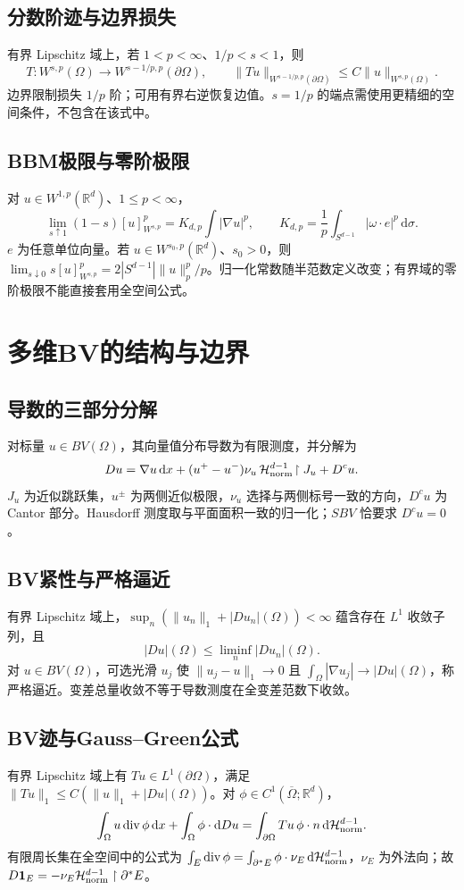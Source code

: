 \documentclass[../main.tex]{subfiles}
\begin{document}
\subsection{分数阶迹与边界损失}
有界 Lipschitz 域上，若 $1<p<\infty$、$1/p<s<1$，则
\[
T:W^{s,p}(\Omega)\to W^{s-1/p,p}(\partial\Omega),\qquad
\|Tu\|_{W^{s-1/p,p}(\partial\Omega)}\le C\|u\|_{W^{s,p}(\Omega)}.
\]
边界限制损失 $1/p$ 阶；可用有界右逆恢复边值。$s=1/p$ 的端点需使用更精细的空间条件，不包含在该式中。
\subsection{BBM极限与零阶极限}
对 $u\in W^{1,p}(\mathbb R^d)$、$1\le p<\infty$，
\[
\lim_{s\uparrow1}(1-s)[u]_{W^{s,p}}^p
=K_{d,p}\int|\nabla u|^p,\qquad K_{d,p}=\frac1p\int_{S^{d-1}}|\omega\cdot e|^p\,\mathrm d\sigma.
\]
$e$ 为任意单位向量。若 $u\in W^{s_0,p}(\mathbb R^d)$、$s_0>0$，则 $\lim_{s\downarrow0}s[u]_{W^{s,p}}^p=2|S^{d-1}|\|u\|_p^p/p$。归一化常数随半范数定义改变；有界域的零阶极限不能直接套用全空间公式。
\section{多维BV的结构与边界}\label{sec:ra-bv}
\subsection{导数的三部分分解}
对标量 $u\in BV(\Omega)$，其向量值分布导数为有限测度，并分解为
\[
Du=\nabla u\,\mathrm dx+(u^+-u^-)\nu_u\,
\mathcal H^{d-1}_{\rm norm}\!\restriction J_u+D^cu.
\]
$J_u$ 为近似跳跃集，$u^\pm$ 为两侧近似极限，$\nu_u$ 选择与两侧标号一致的方向，$D^cu$ 为 Cantor 部分。Hausdorff 测度取与平面面积一致的归一化；$SBV$ 恰要求 $D^cu=0$。
\subsection{BV紧性与严格逼近}
有界 Lipschitz 域上，$\sup_n(\|u_n\|_1+|Du_n|(\Omega))<\infty$ 蕴含存在 $L^1$ 收敛子列，且
\[
|Du|(\Omega)\le\liminf_n|Du_n|(\Omega).
\]
对 $u\in BV(\Omega)$，可选光滑 $u_j$ 使 $\|u_j-u\|_1\to0$ 且 $\int_\Omega|\nabla u_j|\to|Du|(\Omega)$，称严格逼近。变差总量收敛不等于导数测度在全变差范数下收敛。
\subsection{BV迹与Gauss--Green公式}
有界 Lipschitz 域上有 $Tu\in L^1(\partial\Omega)$，满足 $\|Tu\|_1\le C(\|u\|_1+|Du|(\Omega))$。对 $\phi\in C^1(\overline\Omega;\mathbb R^d)$，
\[
\int_\Omega u\operatorname{div}\phi\,\mathrm dx+\int_\Omega\phi\cdot\mathrm dDu
=\int_{\partial\Omega}Tu\,\phi\cdot n\,\mathrm d\mathcal H^{d-1}_{\rm norm}.
\]
有限周长集在全空间中的公式为 $\int_E\operatorname{div}\phi=\int_{\partial^*E}\phi\cdot\nu_E\,\mathrm d\mathcal H^{d-1}_{\rm norm}$，$\nu_E$ 为外法向；故 $D\bm1_E=-\nu_E\mathcal H^{d-1}_{\rm norm}\restriction\partial^*E$。
\end{document}

